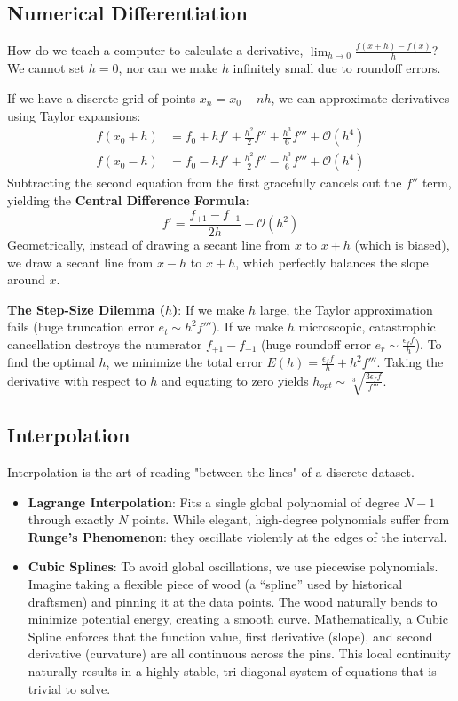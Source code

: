 \documentclass[12pt, a4paper]{article}
\begin{document}
\subsection{Numerical Differentiation}
\label{subsec:diff}
How do we teach a computer to calculate a derivative, $\lim_{h \to 0} \frac{f(x+h)-f(x)}{h}$? We cannot set $h=0$, nor can we make $h$ infinitely small due to roundoff errors. 

If we have a discrete grid of points $x_n = x_0 + nh$, we can approximate derivatives using Taylor expansions:
\begin{align*}
f(x_0 + h) &= f_0 + h f' + \frac{h^2}{2} f'' + \frac{h^3}{6} f''' + \mathcal{O}(h^4) \\
f(x_0 - h) &= f_0 - h f' + \frac{h^2}{2} f'' - \frac{h^3}{6} f''' + \mathcal{O}(h^4)
\end{align*}
Subtracting the second equation from the first gracefully cancels out the $f''$ term, yielding the \textbf{Central Difference Formula}:
\begin{equation}
f' = \frac{f_{+1} - f_{-1}}{2h} + \mathcal{O}(h^2)
\end{equation}
Geometrically, instead of drawing a secant line from $x$ to $x+h$ (which is biased), we draw a secant line from $x-h$ to $x+h$, which perfectly balances the slope around $x$.

\textbf{The Step-Size Dilemma ($h$)}: If we make $h$ large, the Taylor approximation fails (huge truncation error $e_t \sim h^2 f'''$). If we make $h$ microscopic, catastrophic cancellation destroys the numerator $f_{+1} - f_{-1}$ (huge roundoff error $e_r \sim \frac{\epsilon_f f}{h}$). 
To find the optimal $h$, we minimize the total error $E(h) = \frac{\epsilon_f f}{h} + h^2 f'''$. Taking the derivative with respect to $h$ and equating to zero yields $h_{opt} \sim \sqrt[3]{\frac{3 \epsilon_f f}{f'''}}$.

\subsection{Interpolation}
\label{subsec:interp}
Interpolation is the art of reading "between the lines" of a discrete dataset. 
\begin{itemize}
    \item \textbf{Lagrange Interpolation}: Fits a single global polynomial of degree $N-1$ through exactly $N$ points. While elegant, high-degree polynomials suffer from \textbf{Runge's Phenomenon}: they oscillate violently at the edges of the interval. 
    \item \textbf{Cubic Splines}: To avoid global oscillations, we use piecewise polynomials. Imagine taking a flexible piece of wood (a ``spline'' used by historical draftsmen) and pinning it at the data points. The wood naturally bends to minimize potential energy, creating a smooth curve. Mathematically, a Cubic Spline enforces that the function value, first derivative (slope), and second derivative (curvature) are all continuous across the pins. This local continuity naturally results in a highly stable, tri-diagonal system of equations that is trivial to solve.
\end{itemize}
\end{document}
